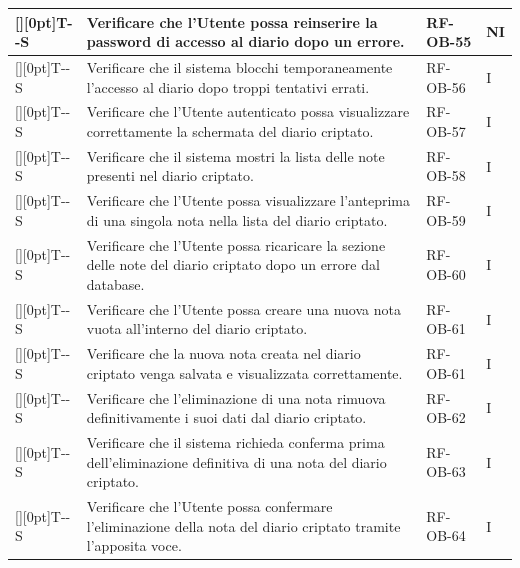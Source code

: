 \documentclass[a4paper,12pt]{article}
\newcounter{testsys}
\newcommand{\systestcode}{%
  \raisebox{0pt}[\height][0pt]{\hypertarget{T-\arabic{testsys}-S}{}}T-\arabic{testsys}-S%
}
\begin{document}
\begin{longtable}{| >{\centering\arraybackslash}p{} | >{\raggedright\arraybackslash}p{} | >{\centering\arraybackslash}p{} | >{\centering\arraybackslash}p{} |}
\stepcounter{testsys} \systestcode & Verificare che l'Utente possa reinserire la password di accesso al diario dopo un errore. & RF-OB-55 & NI \\
\hline

\stepcounter{testsys} \systestcode & Verificare che il sistema blocchi temporaneamente l'accesso al diario dopo troppi tentativi errati. & RF-OB-56 & I \\
\hline

\stepcounter{testsys} \systestcode & Verificare che l'Utente autenticato possa visualizzare correttamente la schermata del diario criptato. & RF-OB-57 & I \\
\hline

\stepcounter{testsys} \systestcode & Verificare che il sistema mostri la lista delle note presenti nel diario criptato. & RF-OB-58 & I \\
\hline

\stepcounter{testsys} \systestcode & Verificare che l'Utente possa visualizzare l'anteprima di una singola nota nella lista del diario criptato. & RF-OB-59 & I \\
\hline

\stepcounter{testsys} \systestcode & Verificare che l'Utente possa ricaricare la sezione delle note del diario criptato dopo un errore dal database. & RF-OB-60 & I \\
\hline

\stepcounter{testsys} \systestcode & Verificare che l'Utente possa creare una nuova nota vuota all'interno del diario criptato. & RF-OB-61 & I \\
\hline

\stepcounter{testsys} \systestcode & Verificare che la nuova nota creata nel diario criptato venga salvata e visualizzata correttamente. & RF-OB-61 & I \\
\hline

\stepcounter{testsys} \systestcode & Verificare che l'eliminazione di una nota rimuova definitivamente i suoi dati dal diario criptato. & RF-OB-62 & I \\
\hline

\stepcounter{testsys} \systestcode & Verificare che il sistema richieda conferma prima dell'eliminazione definitiva di una nota del diario criptato. & RF-OB-63 & I \\
\hline

\stepcounter{testsys} \systestcode & Verificare che l'Utente possa confermare l'eliminazione della nota del diario criptato tramite l'apposita voce. & RF-OB-64 & I \\
\hline


\end{longtable}
\end{document}
